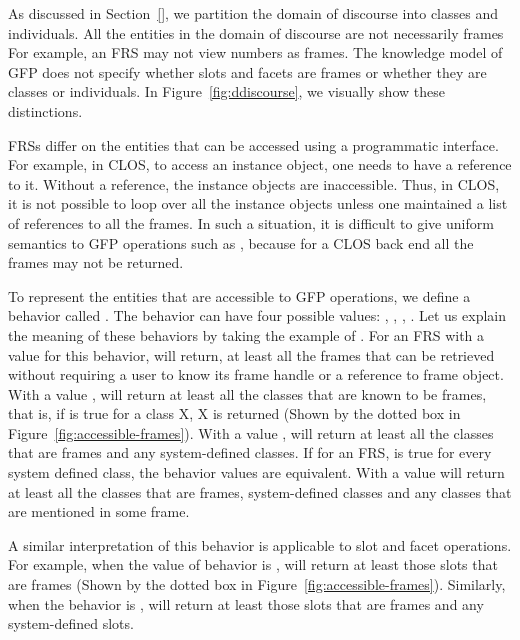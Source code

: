 As discussed in Section~\ref{}, we partition the domain of discourse
into classes and individuals.  All the entities in the domain of
discourse are not necessarily frames For example, an FRS may not view
numbers as frames.  The knowledge model of GFP does not specify
whether slots and facets are frames or whether they are classes or
individuals.  In Figure~\ref{fig:ddiscourse}, we visually show these
distinctions.

FRSs differ on the entities that can be accessed using a programmatic
interface.  For example, in CLOS, to access an instance object, one needs
to have a reference to it.  Without a reference, the instance objects are
inaccessible.  Thus, in CLOS, it is not possible to loop over  all the 
instance objects unless one maintained a list of references to all the
frames.  In such a situation, it is difficult to give uniform semantics
to GFP operations such as , because for a CLOS back end
all the frames may not be returned.  

To represent the entities that are accessible to GFP operations, we
define a behavior called .  The
 behavior can have four possible values:
, ,
, .  Let us explain
the meaning of these behaviors by taking the example of 
.
For an FRS with a value  for this behavior, 
will return, at least all the frames that can be retrieved without requiring a user to
know its frame handle or a reference to frame object.  With a value ,
 will return at least all the classes that are known to be frames,
that is, if  is true for a class X, X is returned (Shown by the
dotted box in Figure~\ref{fig:accessible-frames}).
With a value ,  
will return at least all the classes that are frames and any system-defined classes.  If
for an FRS,  is true for every system defined class,
the behavior values  
are equivalent.  With a value 
 will return at least all the classes that are frames,
system-defined classes and any classes that are mentioned in some
frame.

A similar interpretation of this behavior is applicable to slot and facet operations.
For example, when the value of   behavior is ,
 will return at least those slots that are frames (Shown by the
dotted box in Figure~\ref{fig:accessible-frames}).  Similarly, when
the behavior is ,
 will return at least those slots that are frames
and any system-defined slots.

